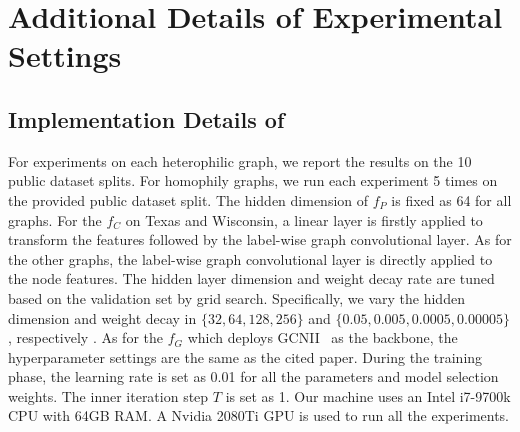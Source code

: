 \section{Additional Details of Experimental Settings}
\subsection{Implementation Details of {\method}}
\label{app:implement} 
For experiments on each heterophilic graph, we report the results on the 10 public dataset splits. For homophily graphs, we run each experiment 5 times on the provided public dataset split. 
The hidden dimension of $f_P$ is fixed as 64 for all graphs. For the $f_C$ on Texas and Wisconsin, a linear layer is firstly applied to transform the features followed by the label-wise graph convolutional layer. As for the other graphs, the label-wise graph convolutional layer is directly applied to the node features. The hidden layer dimension and weight decay rate are tuned based on the validation set by grid search. Specifically, we vary the hidden dimension and weight decay in $\{32,64,128,256\}$ and $\{0.05,0.005,0.0005,0.00005\}$, respectively .
As for the $f_G$ which deploys GCNII~\cite{chen2020simple} as the backbone, the hyperparameter settings are the same as the cited paper. During the training phase, the learning rate is set as 0.01 for all the parameters and model selection weights. The inner iteration step $T$ is set as 1. Our machine uses an Intel i7-9700k CPU with 64GB RAM. A Nvidia 2080Ti GPU is used to run all the experiments.


